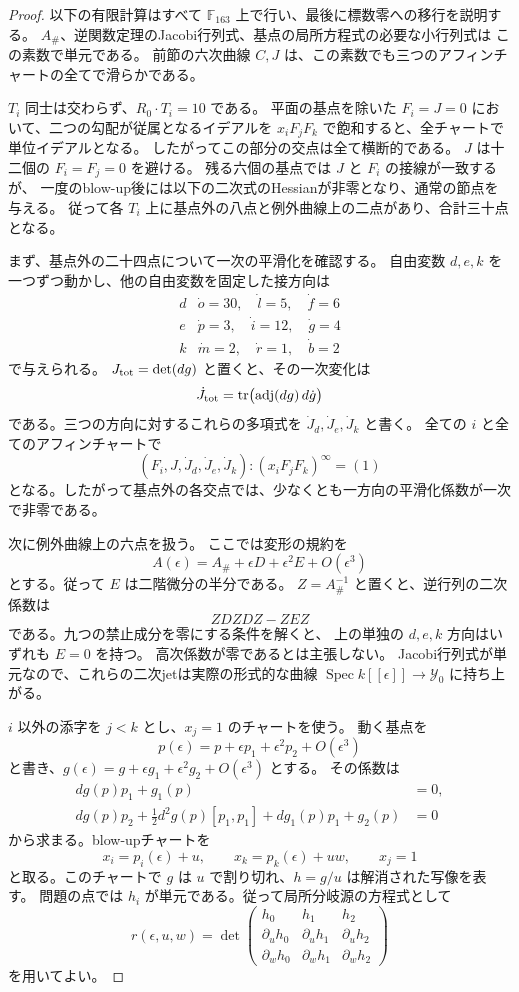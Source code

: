 \begin{proof}
以下の有限計算はすべて $\mathbb F_{163}$ 上で行い、最後に標数零への移行を説明する。
$A_\#$、逆関数定理のJacobi行列式、基点の局所方程式の必要な小行列式は
この素数で単元である。
前節の六次曲線 $C,J$ は、この素数でも三つのアフィンチャートの全てで滑らかである。

$T_i$ 同士は交わらず、$R_0\cdot T_i=10$ である。
平面の基点を除いた $F_i=J=0$ において、二つの勾配が従属となるイデアルを
$x_iF_jF_k$ で飽和すると、全チャートで単位イデアルとなる。
したがってこの部分の交点は全て横断的である。
$J$ は十二個の $F_i=F_j=0$ を避ける。
残る六個の基点では $J$ と $F_i$ の接線が一致するが、
一度のblow-up後には以下の二次式のHessianが非零となり、通常の節点を与える。
従って各 $T_i$ 上に基点外の八点と例外曲線上の二点があり、合計三十点となる。

まず、基点外の二十四点について一次の平滑化を確認する。
自由変数 $d,e,k$ を一つずつ動かし、他の自由変数を固定した接方向は
\[
\begin{array}{c|l}
 d&\dot o=30,\quad\dot l=5,\quad\dot f=6\\
 e&\dot p=3,\quad\dot i=12,\quad\dot g=4\\
 k&\dot m=2,\quad\dot r=1,\quad\dot b=2
\end{array}
\]
で与えられる。
$J_{\rm tot}=\det(dg)$ と置くと、その一次変化は
\[
 \dot J_{\rm tot}
   =\operatorname{tr}\bigl(\operatorname{adj}(dg)\,d\dot g\bigr)
\]
である。三つの方向に対するこれらの多項式を $\dot J_d,\dot J_e,\dot J_k$ と書く。
全ての $i$ と全てのアフィンチャートで
\[
 (F_i,J,\dot J_d,\dot J_e,\dot J_k):(x_iF_jF_k)^\infty=(1)
\]
となる。したがって基点外の各交点では、少なくとも一方向の平滑化係数が一次で非零である。

次に例外曲線上の六点を扱う。
ここでは変形の規約を
\[
 A(\epsilon)=A_\#+\epsilon D+\epsilon^2 E+O(\epsilon^3)
\]
とする。従って $E$ は二階微分の半分である。
$Z=A_\#^{-1}$ と置くと、逆行列の二次係数は
\[
 ZDZDZ-ZEZ
\]
である。九つの禁止成分を零にする条件を解くと、
上の単独の $d,e,k$ 方向はいずれも $E=0$ を持つ。
高次係数が零であるとは主張しない。
Jacobi行列式が単元なので、これらの二次jetは実際の形式的な曲線
$\operatorname{Spec}k[[\epsilon]]\to\mathcal Y_0$ に持ち上がる。

$i$ 以外の添字を $j<k$ とし、$x_j=1$ のチャートを使う。
動く基点を
\[
 p(\epsilon)=p+\epsilon p_1+\epsilon^2p_2+O(\epsilon^3)
\]
と書き、$g(\epsilon)=g+\epsilon g_1+\epsilon^2g_2+O(\epsilon^3)$ とする。
その係数は
\begin{align*}
 dg(p)p_1+g_1(p)&=0,\\
 dg(p)p_2+\frac12d^2g(p)[p_1,p_1]+dg_1(p)p_1+g_2(p)&=0
\end{align*}
から求まる。blow-upチャートを
\[
 x_i=p_i(\epsilon)+u,\qquad x_k=p_k(\epsilon)+uw,\qquad x_j=1
\]
と取る。このチャートで $g$ は $u$ で割り切れ、$h=g/u$ は解消された写像を表す。
問題の点では $h_i$ が単元である。従って局所分岐源の方程式として
\[
 r(\epsilon,u,w)=\det\begin{pmatrix}
 h_0&h_1&h_2\\
 \partial_u h_0&\partial_u h_1&\partial_u h_2\\
 \partial_w h_0&\partial_w h_1&\partial_w h_2
 \end{pmatrix}
\]
を用いてよい。


\end{proof}
